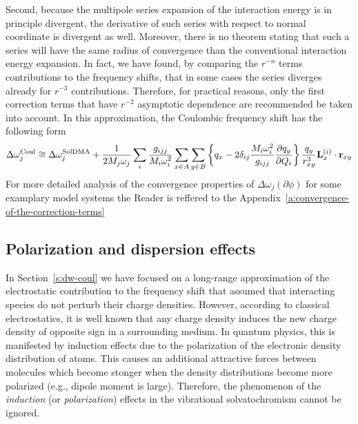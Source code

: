 \documentclass[a4paper,titlepage,twoside,fleqn,12pt]{book}
\newcommand{\fderiv}[2]{\ensuremath{
\frac{\partial #1}{\partial #2}}}
\begin{document}
\begin{refsection}
Second, because the multipole series expansion of the interaction energy
is in principle divergent, the derivative of such series
with respect to normal coordinate is divergent as well. Moreover, 
there is no theorem stating that such a series will have the same radius of convergence
than the conventional interaction energy expansion. In fact,
we have found, by comparing the $r^{-n}$ terms contributions to the frequency
shifts, that in some cases the series diverges already for 
$r^{-3}$ contributions. Therefore, for practical reasons, only
the first correction terms that have $r^{-2}$ asymptotic dependence
are recommended be taken into account. In this approximation,
the Coulombic frequency shift has the following form
%
\begin{equation} \label{e:dw-solefp-coul-working}
\Delta\omega_j^{\rm Coul} \cong \Delta\omega_j^{\rm SolDMA} + \frac{1}{2M_j\omega_j}
\sum_i \frac{g_{ijj}}{M_i\omega_i^2} \sum_{x \in A}\sum_{y \in B}
\left\{ q_x - 2\delta_{ij} \frac{M_i\omega_i^2}{g_{ijj}} 
\fderiv{q_y}{Q_i} \right\} \frac{q_y}{r_{xy}^3} {\bf L}_x^{(i)} \cdot {\bf r}_{xy} 
\end{equation}
%
For more detailed analysis of the convergence properties
of $\Delta\omega_j({\partial\phi})$ for some examplary model 
systems the Reader is reffered to
the Appendix~\ref{a:convergence-of-the-correction-terms}


\subsection{Polarization and dispersion effects}

In Section~\ref{s:dw-coul} we have focused on a long\hyp{}range
approximation of the electrostatic contribution to the frequency
shift that assumed that interacting species do not perturb
their charge densities. However, according to classical electrostatics,
it is well known that any charge density induces the new
charge density of opposite sign in a surrounding medium. In quantum
physics, this is manifested by induction effects due to the polarization
of the electronic density distribution of atoms. This causes
an additional attractive forces between molecules which
become stonger when the density distributions become more polarized
(e.g., dipole moment is large). Therefore, the
phenomenon of the \emph{induction} (or \emph{polarization}) effects
in the vibrational solvatochromism cannot be ignored.


\end{refsection}
\end{document}
